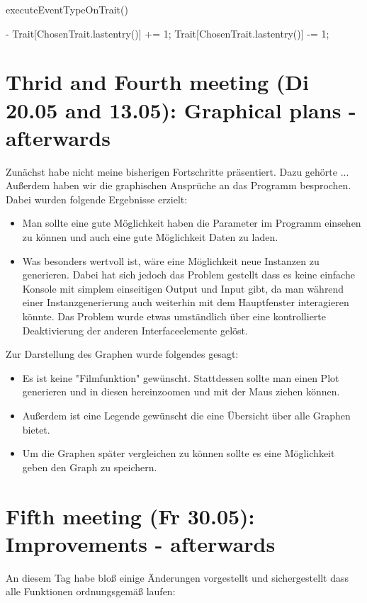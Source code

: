 \documentclass{article}
\begin{document}
\begin{algorithm}[H]
	\caption{executeEventTypeOnTrait()}
	\begin{algorithmic}[1]
		\REQUIRE -
			\STATE Trait[ChosenTrait.lastentry()] += 1;
		\ELSE
			\STATE Trait[ChosenTrait.lastentry()] -= 1;
			\ENDIF
		\ENDIF
	\end{algorithmic}
\end{algorithm}
\listofalgorithms

\newpage
\section{Thrid and Fourth meeting (Di 20.05 and 13.05): Graphical plans - afterwards}
Zunächst habe nicht meine bisherigen Fortschritte präsentiert. Dazu gehörte ...\\
Außerdem haben wir die graphischen Ansprüche an das Programm besprochen.
Dabei wurden folgende Ergebnisse erzielt:
\begin{itemize}
\item Man sollte eine gute Möglichkeit haben die Parameter im Programm einsehen zu können und auch eine gute Möglichkeit Daten zu laden.
\item Was besonders wertvoll ist, wäre eine Möglichkeit neue Instanzen zu generieren. Dabei hat sich jedoch das Problem gestellt dass es keine einfache Konsole mit simplem einseitigen Output und Input gibt, da man während einer Instanzgenerierung auch weiterhin mit dem Hauptfenster interagieren könnte. Das Problem wurde etwas umständlich über eine kontrollierte Deaktivierung der anderen Interfaceelemente gelöst.
\end{itemize}
Zur Darstellung des Graphen wurde folgendes gesagt:
\begin{itemize}
\item Es ist keine "{}Filmfunktion"{} gewünscht. Stattdessen sollte man einen Plot generieren und in diesen hereinzoomen und mit der Maus ziehen können.
\item Außerdem ist eine Legende gewünscht die eine Übersicht über alle Graphen bietet. 
\item Um die Graphen später vergleichen zu können sollte es eine Möglichkeit geben den Graph zu speichern.
\end{itemize}

\newpage
\section{Fifth meeting (Fr 30.05): Improvements - afterwards}
An diesem Tag habe bloß einige Änderungen vorgestellt und sichergestellt dass alle Funktionen ordnungsgemäß laufen:
\end{document}
